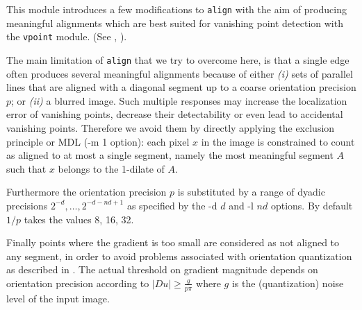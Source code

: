 This module introduces a few modifications to \verb+align+
with the aim of producing meaningful alignments which are best suited for
vanishing point detection with the \verb+vpoint+ module. 
(See \cite{almansa.desolneux.vamech:vanish}, \cite{almansa:phd}).

The main limitation of \verb+align+ that we try to overcome here,
is that a single edge often produces several meaningful alignments
because of either \emph{(i)} sets of parallel lines that are aligned with a diagonal segment up to a coarse orientation precision $p$; or \emph{(ii)} a blurred image.
Such multiple responses may increase the localization error of vanishing points, decrease their detectability or even lead to accidental vanishing points.
Therefore we avoid them by directly applying the exclusion principle or MDL (-m 1 option): each pixel $x$ in the image is constrained to count as aligned to at most a single segment, namely the most meaningful segment $A$ such that $x$ belongs to the 1-dilate of $A$.

Furthermore the orientation precision $p$ is substituted by a range of dyadic precisions $2^{-d},\dots,2^{-d-nd+1}$ as specified by the -d $d$ and -l $nd$ options. By default $1/p$ takes the values 8, 16, 32.

Finally points where the gradient is too small are considered as not aligned to any segment, in order to avoid problems associated with orientation quantization as described in \cite{desolneux.ladjal.ea:dequant}. The actual threshold on gradient magnitude depends on orientation precision according to
$        |Du| \geq \frac{g}{p\pi} $
where $g$ is the (quantization) noise level of the input image.


